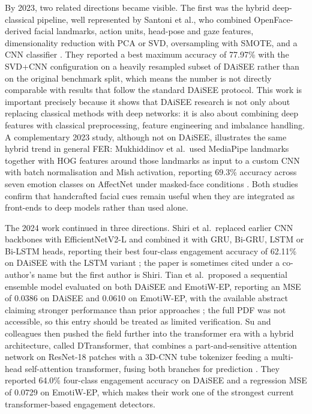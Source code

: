 By 2023, two related directions became visible. The first was the hybrid deep-classical pipeline, well represented by Santoni et al., who combined OpenFace-derived facial landmarks, action units, head-pose and gaze features, dimensionality reduction with PCA or SVD, oversampling with SMOTE, and a \ac{CNN} classifier \cite{santoni_convolutional_2023}. They reported a best maximum accuracy of 77.97\% with the SVD+\ac{CNN} configuration on a heavily resampled subset of \ac{DAiSEE} rather than on the original benchmark split, which means the number is not directly comparable with results that follow the standard \ac{DAiSEE} protocol. This work is important precisely because it shows that \ac{DAiSEE} research is not only about replacing classical methods with deep networks: it is also about combining deep features with classical preprocessing, feature engineering and imbalance handling. A complementary 2023 study, although not on \ac{DAiSEE}, illustrates the same hybrid trend in general \ac{FER}: Mukhiddinov et al.\ used MediaPipe landmarks together with \ac{HOG} features around those landmarks as input to a custom \ac{CNN} with batch normalisation and Mish activation, reporting 69.3\% accuracy across seven emotion classes on AffectNet under masked-face conditions \cite{mukhiddinov_masked_2023}. Both studies confirm that handcrafted facial cues remain useful when they are integrated as front-ends to deep models rather than used alone.

The 2024 work continued in three directions. Shiri et al.\ replaced earlier \ac{CNN} backbones with EfficientNetV2-L and combined it with \ac{GRU}, Bi-\ac{GRU}, \ac{LSTM} or Bi-\ac{LSTM} heads, reporting their best four-class engagement accuracy of 62.11\% on \ac{DAiSEE} with the \ac{LSTM} variant \cite{shiri_detection_2024}; the paper is sometimes cited under a co-author's name but the first author is Shiri. Tian et al.\ proposed a sequential ensemble model evaluated on both \ac{DAiSEE} and EmotiW-EP, reporting an MSE of 0.0386 on \ac{DAiSEE} and 0.0610 on EmotiW-EP, with the available abstract claiming stronger performance than prior approaches \cite{tian_predicting_2024}; the full PDF was not accessible, so this entry should be treated as limited verification. Su and colleagues then pushed the field further into the transformer era with a hybrid architecture, called DTransformer, that combines a part-and-sensitive attention network on ResNet-18 patches with a 3D-\ac{CNN} tube tokenizer feeding a multi-head self-attention transformer, fusing both branches for prediction \cite{su_leveraging_2024}. They reported 64.0\% four-class engagement accuracy on \ac{DAiSEE} and a regression MSE of 0.0729 on EmotiW-EP, which makes their work one of the strongest current transformer-based engagement detectors.

